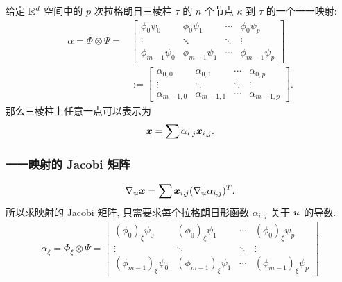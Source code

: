\documentclass{beamer}
\numberwithin{subsection}{section}
\begin{document}
\begin{frame}
    给定 ${\mathbb R}^d$ 空间中的 $p$ 次拉格朗日三棱柱 $\tau$ 的 $n$ 个节点
    $\kappa$ 到 $\tau$ 的一个一一映射: \begin{align*}
        \alpha = \Phi \otimes \Psi =&
        \begin{bmatrix}
            \phi_0 \psi_0 & \phi_0 \psi_1  & \cdots & \phi_0 \psi_p \\ 
            \vdots        &   \ddots       & \ddots &  \vdots       \\
            \phi_{m-1}\psi_0 & \phi_{m-1}\psi_1 & \cdots& \phi_{m-1}\psi_p  
        \end{bmatrix}\\
        &:=
        \begin{bmatrix}
            \alpha_{0,0}   & \alpha_{0,1}    & \cdots & \alpha_{0,p} \\ 
            \vdots        &   \ddots       & \ddots &  \vdots       \\
            \alpha_{m-1,0}   &  \alpha_{m-1,1}   & \cdots &  \alpha_{m-1,p} 
        \end{bmatrix}.
    \end{align*}
    那么三棱柱上任意一点可以表示为
    \begin{equation*}
        {\boldsymbol x} = \sum\alpha_{i,j}{\boldsymbol x}_{i,j}.
    \end{equation*}
\end{frame}

\begin{frame}
    \frametitle{一一映射的 Jacobi 矩阵}
    \begin{equation*}
        \nabla_{\boldsymbol u} {\boldsymbol x} = \sum{\boldsymbol x}_{i,j}(\nabla_{\boldsymbol u} \alpha_{i,j})^T.
    \end{equation*} 
    所以求映射的 Jacobi 矩阵, 只需要求每个拉格朗日形函数 $\alpha_{i,j}$ 关于
    ${\boldsymbol u}$ 的导数.
    \begin{align*}
       \alpha_\xi = \Phi_\xi \otimes \Psi = 
       \begin{bmatrix}
       (\phi_0)_\xi \psi_0 & (\phi_0)_\xi \psi_1  & \cdots & (\phi_0)_\xi \psi_p \\ 
       \vdots        &   \ddots       & \ddots &  \vdots       \\
       (\phi_{m-1})_\xi \psi_0 &  (\phi_{m-1})_\xi \psi_1 &  \cdots&
       (\phi_{m-1})_\xi\psi_p 
       \end{bmatrix}
   \end{align*}
\end{frame}
\end{document}
